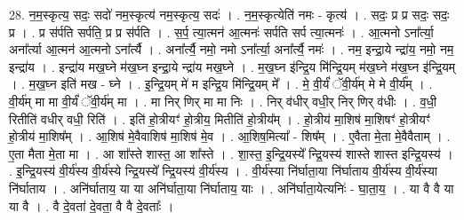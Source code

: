 \documentclass[17pt]{extarticle}
\begin{document}
28. न॒म॒स्कृत्य॒ सदः॒ सदो॑ नम॒स्कृत्य॑ नम॒स्कृत्य॒ सदः॑ । . न॒म॒स्कृत्येति॑ नमः - कृत्य॑ । . सदः॒ प्र प्र सदः॒ सदः॒ प्र । . प्र स॑र्पति सर्पति॒ प्र प्र स॑र्पति । . स॒र्प॒ त्या॒त्मन॑ आ॒त्मनः॑ सर्पति सर्प त्या॒त्मनः॑ । . आ॒त्मनो ऽना᳚र्त्या॒ अना᳚र्त्या आ॒त्मन॑ आ॒त्मनो ऽना᳚र्त्यै । . अना᳚र्त्यै॒ नमो॒ नमो ऽना᳚र्त्या॒ अना᳚र्त्यै॒ नमः॑ । . नम॒ इन्द्रा॒ये न्द्रा॑य॒ नमो॒ नम॒ इन्द्रा॑य । . इन्द्रा॑य मख॒घ्ने म॑ख॒घ्न इन्द्रा॒ये न्द्रा॑य मख॒घ्ने । . म॒ख॒घ्न इ॑न्द्रि॒य मि॑न्द्रि॒यम् म॑ख॒घ्ने म॑ख॒घ्न इ॑न्द्रि॒यम् । . म॒ख॒घ्न इति॑ मख - घ्ने । . इ॒न्द्रि॒यम् मे॑ म इन्द्रि॒य मि॑न्द्रि॒यम् मे᳚ । . मे॒ वी॒र्यं॑ ॅवी॒र्य॑म् मे मे वी॒र्य᳚म् । . वी॒र्य॑म् मा मा वी॒र्यं॑ ॅवी॒र्य॑म् मा । . मा निर् णिर् मा मा निः । . निर् व॑धीर् वधी॒र् निर् णिर् व॑धीः । . व॒धी॒ रितीति॑ वधीर् वधी॒ रिति॑ । . इति॑ हो॒त्रीयꣳ॑ हो॒त्रीय॒ मितीति॑ हो॒त्रीय᳚म् । . हो॒त्रीय॑ मा॒शिष॑ मा॒शिषꣳ॑ हो॒त्रीयꣳ॑ हो॒त्रीय॑ मा॒शिष᳚म् । . आ॒शिष॑ मे॒वैवाशिष॑ मा॒शिष॑ मे॒व । . आ॒शिष॒मित्या᳚ - शिष᳚म् । . ए॒वैता मे॒ता मे॒वैवैताम् । . ए॒ता मैता मे॒ता मा । . आ शा᳚स्ते शास्त॒ आ शा᳚स्ते । . शा॒स्त॒ इ॒न्द्रि॒यस्ये᳚ न्द्रि॒यस्य॑ शास्ते शास्त इन्द्रि॒यस्य॑ । . इ॒न्द्रि॒यस्य॑ वी॒र्य॑स्य वी॒र्य॑स्ये न्द्रि॒यस्ये᳚ न्द्रि॒यस्य॑ वी॒र्य॑स्य । . वी॒र्य॑स्या नि॑र्घाता॒या नि॑र्घाताय वी॒र्य॑स्य वी॒र्य॑स्या नि॑र्घाताय । . अनि॑र्घाताय॒ या या अनि॑र्घाता॒या नि॑र्घाताय॒ याः । . अनि॑र्घाता॒येत्यनिः॑ - घा॒ता॒य॒ । . या वै वै या या वै । . वै दे॒वता॑ दे॒वता॒ वै वै दे॒वताः᳚ । \newline
\end{document}
